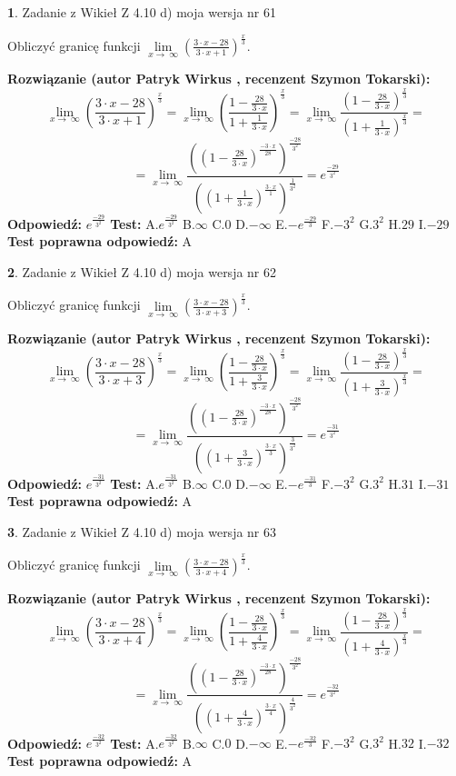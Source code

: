 \documentclass[12pt, a4paper]{article}
\theoremstyle{definition} %
\newtheorem{zad}{}
\newcommand{\zadStart}[1]{\begin{zad}#1\newline}
\newcommand{\zadStop}{\end{zad}}
\newcommand{\rozwStart}[2]{\noindent \textbf{Rozwiązanie (autor #1 , recenzent #2): }\newline}
\newcommand{\rozwStop}{\newline}
\newcommand{\odpStart}{\noindent \textbf{Odpowiedź:}\newline}
\newcommand{\odpStop}{\newline}
\newcommand{\testStart}{\noindent \textbf{Test:}\newline}
\newcommand{\testStop}{\newline}
\newcommand{\kluczStart}{\noindent \textbf{Test poprawna odpowiedź:}\newline}
\newcommand{\kluczStop}{\newline}
\begin{document}
\zadStart{Zadanie z Wikieł Z 4.10 d) moja wersja nr 61}


Obliczyć granicę funkcji  $\lim\limits_{x\to\ \infty}(\frac{3\cdot x-28}{3\cdot x+1})^{\frac{x}{3}}$.
\zadStop
\rozwStart{Patryk Wirkus}{Szymon Tokarski}
$$\lim\limits_{x\to\ \infty}(\frac{3\cdot x-28}{3\cdot x+1})^{\frac{x}{3}} = \lim\limits_{x\to\ \infty}(\frac{1-\frac{28}{3\cdot x}}{1+\frac{1}{3\cdot x}})^{\frac{x}{3}}=\lim\limits_{x\to\ \infty}\frac{(1-\frac{28}{3\cdot x})^{\frac{x}{3}}}{(1+\frac{1}{3\cdot x})^{\frac{x}{3}}}=$$
$$=\lim\limits_{x\to\ \infty}\frac{((1-\frac{28}{3\cdot x})^{\frac{-3\cdot x}{28}})^{\frac{-28}{3^{2}}}}{((1+\frac{1}{3\cdot x})^{\frac{3\cdot x}{1}})^{\frac{1}{3^{2}}}}=e^{\frac{-29}{3^{2}}}$$
\rozwStop
\odpStart
$e^{\frac{-29}{3^{2}}}$
\odpStop
\testStart
A.$e^{\frac{-29}{3^{2}}}$ B.$\infty$ C.$0$ D.$-\infty$ E.$-e^{\frac{-29}{3}}$
F.$-3^{2}$ G.$3^{2}$
H.$29$
I.$-29$
\testStop
\kluczStart
A
\kluczStop



\zadStart{Zadanie z Wikieł Z 4.10 d) moja wersja nr 62}


Obliczyć granicę funkcji  $\lim\limits_{x\to\ \infty}(\frac{3\cdot x-28}{3\cdot x+3})^{\frac{x}{3}}$.
\zadStop
\rozwStart{Patryk Wirkus}{Szymon Tokarski}
$$\lim\limits_{x\to\ \infty}(\frac{3\cdot x-28}{3\cdot x+3})^{\frac{x}{3}} = \lim\limits_{x\to\ \infty}(\frac{1-\frac{28}{3\cdot x}}{1+\frac{3}{3\cdot x}})^{\frac{x}{3}}=\lim\limits_{x\to\ \infty}\frac{(1-\frac{28}{3\cdot x})^{\frac{x}{3}}}{(1+\frac{3}{3\cdot x})^{\frac{x}{3}}}=$$
$$=\lim\limits_{x\to\ \infty}\frac{((1-\frac{28}{3\cdot x})^{\frac{-3\cdot x}{28}})^{\frac{-28}{3^{2}}}}{((1+\frac{3}{3\cdot x})^{\frac{3\cdot x}{3}})^{\frac{3}{3^{2}}}}=e^{\frac{-31}{3^{2}}}$$
\rozwStop
\odpStart
$e^{\frac{-31}{3^{2}}}$
\odpStop
\testStart
A.$e^{\frac{-31}{3^{2}}}$ B.$\infty$ C.$0$ D.$-\infty$ E.$-e^{\frac{-31}{3}}$
F.$-3^{2}$ G.$3^{2}$
H.$31$
I.$-31$
\testStop
\kluczStart
A
\kluczStop



\zadStart{Zadanie z Wikieł Z 4.10 d) moja wersja nr 63}


Obliczyć granicę funkcji  $\lim\limits_{x\to\ \infty}(\frac{3\cdot x-28}{3\cdot x+4})^{\frac{x}{3}}$.
\zadStop
\rozwStart{Patryk Wirkus}{Szymon Tokarski}
$$\lim\limits_{x\to\ \infty}(\frac{3\cdot x-28}{3\cdot x+4})^{\frac{x}{3}} = \lim\limits_{x\to\ \infty}(\frac{1-\frac{28}{3\cdot x}}{1+\frac{4}{3\cdot x}})^{\frac{x}{3}}=\lim\limits_{x\to\ \infty}\frac{(1-\frac{28}{3\cdot x})^{\frac{x}{3}}}{(1+\frac{4}{3\cdot x})^{\frac{x}{3}}}=$$
$$=\lim\limits_{x\to\ \infty}\frac{((1-\frac{28}{3\cdot x})^{\frac{-3\cdot x}{28}})^{\frac{-28}{3^{2}}}}{((1+\frac{4}{3\cdot x})^{\frac{3\cdot x}{4}})^{\frac{4}{3^{2}}}}=e^{\frac{-32}{3^{2}}}$$
\rozwStop
\odpStart
$e^{\frac{-32}{3^{2}}}$
\odpStop
\testStart
A.$e^{\frac{-32}{3^{2}}}$ B.$\infty$ C.$0$ D.$-\infty$ E.$-e^{\frac{-32}{3}}$
F.$-3^{2}$ G.$3^{2}$
H.$32$
I.$-32$
\testStop
\kluczStart
A
\kluczStop
\end{document}
